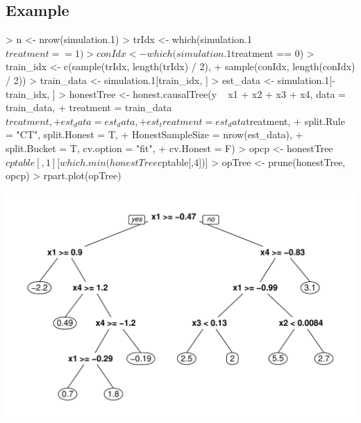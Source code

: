 \documentclass[11pt]{article}
\renewenvironment{Schunk}{\vspace{\topsep}}{\vspace{\topsep}}
\begin{document}
\subsection{Example}
\begin{Schunk}
\begin{Sinput}
> n <- nrow(simulation.1)
> trIdx <- which(simulation.1$treatment == 1)
> conIdx <- which(simulation.1$treatment == 0)
> train_idx <- c(sample(trIdx, length(trIdx) / 2), 
+                sample(conIdx, length(conIdx) / 2))
> train_data <- simulation.1[train_idx, ]
> est_data <- simulation.1[-train_idx, ]
> honestTree <- honest.causalTree(y ~ x1 + x2 + x3 + x4, data = train_data,
+                                 treatment = train_data$treatment, 
+                                 est_data = est_data, 
+                                 est_treatment = est_data$treatment, 
+                                 split.Rule = "CT", split.Honest = T, 
+                                 HonestSampleSize = nrow(est_data), 
+                                 split.Bucket = T, cv.option = "fit",
+                                 cv.Honest = F)
> opcp <-  honestTree$cptable[,1][which.min(honestTree$cptable[,4])]
> opTree <- prune(honestTree, opcp)
> rpart.plot(opTree)
\end{Sinput}
\end{Schunk}
\includegraphics{briefintro-example3}



\end{document}
